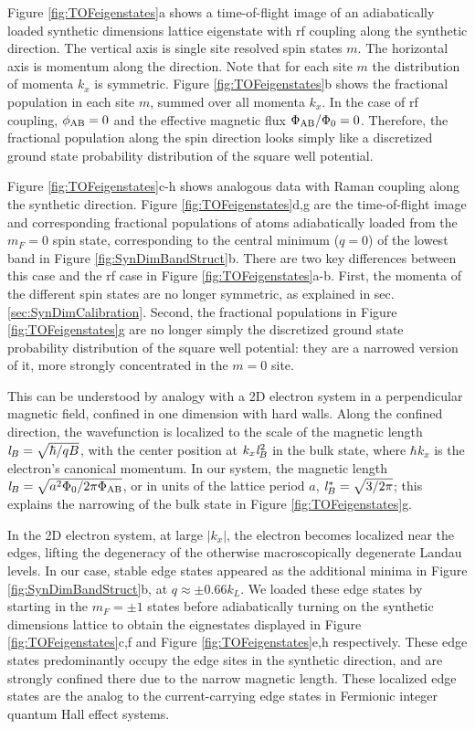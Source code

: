 Figure \ref{fig:TOFeigenstates}a shows a time-of-flight image of an adiabatically loaded synthetic dimensions lattice eigenstate with rf coupling along the synthetic direction. The vertical axis is single site resolved spin states $m$. The horizontal axis is momentum along the \ex{} direction. Note that for each site $m$ the distribution of momenta $k_x$ is symmetric. Figure \ref{fig:TOFeigenstates}b shows the fractional population in each site $m$, summed over all momenta $k_x$.  In the case of rf coupling, $\phi_{\rm AB}=0$ and the effective magnetic flux $\Phi_{\rm AB}/\Phi_0=0$.  Therefore, the fractional population along the spin direction looks simply like a discretized ground state probability distribution of the square well potential.

Figure \ref{fig:TOFeigenstates}c-h shows analogous data with Raman coupling along the synthetic direction. Figure \ref{fig:TOFeigenstates}d,g are the time-of-flight image and corresponding fractional populations of atoms adiabatically loaded from the $m_F=0$ spin state, corresponding to the central minimum ($q=0$) of the lowest band in Figure \ref{fig:SynDimBandStruct}b. There are two key differences between this case and the rf case in Figure \ref{fig:TOFeigenstates}a-b. First, the momenta of the different spin states are no longer symmetric, as explained in sec. \ref{sec:SynDimCalibration}. Second, the fractional populations in Figure \ref{fig:TOFeigenstates}g are no longer simply the discretized ground state probability distribution of the square well potential: they are a narrowed version of it, more strongly concentrated in the $m=0$ site. 

This can be understood by analogy with a 2D electron system in a perpendicular magnetic field, confined in one dimension with hard walls. Along the confined direction, the wavefunction is localized to the scale of the magnetic length ${\it l}_B=\sqrt{\hbar/qB}$, with the center position at $k_x {\it l}_B^2$ in the bulk state, where $\hbar k_x$ is the electron’s canonical momentum. In our system, the magnetic length ${\it l}_B=\sqrt{a^2 \Phi_0/2\pi\Phi_{\rm AB}}$, or in units of the lattice period $a$, ${\it l}^*_B=\sqrt{3/2\pi}$; this explains the narrowing of the bulk state in Figure \ref{fig:TOFeigenstates}g.

In the 2D electron system, at large $|k_x|$, the electron becomes localized near the edges, lifting the degeneracy of the otherwise macroscopically degenerate Landau levels. In our case, stable edge states appeared as the additional minima in Figure \ref{fig:SynDimBandStruct}b, at $q\approx\pm0.66 k_L$. We loaded these edge states by starting in the $m_F=\pm1$ states before adiabatically turning on the synthetic dimensions lattice to obtain the eignestates displayed in Figure \ref{fig:TOFeigenstates}c,f and Figure \ref{fig:TOFeigenstates}e,h respectively. These edge states predominantly occupy the edge sites in the synthetic direction, and are strongly confined there due to the narrow magnetic length. These localized edge states are the analog to the current-carrying edge states in Fermionic integer quantum Hall effect systems\cite{Hugel2014}.

